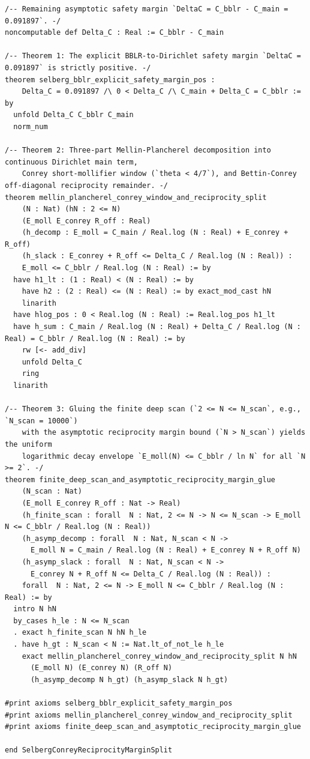 \documentclass[11pt,a4paper]{article}
\begin{document}
\begin{lstlisting}[language=Lean4]
/-- Remaining asymptotic safety margin `DeltaC = C_bblr - C_main = 0.091897`. -/
noncomputable def Delta_C : Real := C_bblr - C_main

/-- Theorem 1: The explicit BBLR-to-Dirichlet safety margin `DeltaC = 0.091897` is strictly positive. -/
theorem selberg_bblr_explicit_safety_margin_pos :
    Delta_C = 0.091897 /\ 0 < Delta_C /\ C_main + Delta_C = C_bblr := by
  unfold Delta_C C_bblr C_main
  norm_num

/-- Theorem 2: Three-part Mellin-Plancherel decomposition into continuous Dirichlet main term,
    Conrey short-mollifier window (`theta < 4/7`), and Bettin-Conrey off-diagonal reciprocity remainder. -/
theorem mellin_plancherel_conrey_window_and_reciprocity_split
    (N : Nat) (hN : 2 <= N)
    (E_moll E_conrey R_off : Real)
    (h_decomp : E_moll = C_main / Real.log (N : Real) + E_conrey + R_off)
    (h_slack : E_conrey + R_off <= Delta_C / Real.log (N : Real)) :
    E_moll <= C_bblr / Real.log (N : Real) := by
  have h1_lt : (1 : Real) < (N : Real) := by
    have h2 : (2 : Real) <= (N : Real) := by exact_mod_cast hN
    linarith
  have hlog_pos : 0 < Real.log (N : Real) := Real.log_pos h1_lt
  have h_sum : C_main / Real.log (N : Real) + Delta_C / Real.log (N : Real) = C_bblr / Real.log (N : Real) := by
    rw [<- add_div]
    unfold Delta_C
    ring
  linarith

/-- Theorem 3: Gluing the finite deep scan (`2 <= N <= N_scan`, e.g., `N_scan = 10000`)
    with the asymptotic reciprocity margin bound (`N > N_scan`) yields the uniform
    logarithmic decay envelope `E_moll(N) <= C_bblr / ln N` for all `N >= 2`. -/
theorem finite_deep_scan_and_asymptotic_reciprocity_margin_glue
    (N_scan : Nat)
    (E_moll E_conrey R_off : Nat -> Real)
    (h_finite_scan : forall  N : Nat, 2 <= N -> N <= N_scan -> E_moll N <= C_bblr / Real.log (N : Real))
    (h_asymp_decomp : forall  N : Nat, N_scan < N ->
      E_moll N = C_main / Real.log (N : Real) + E_conrey N + R_off N)
    (h_asymp_slack : forall  N : Nat, N_scan < N ->
      E_conrey N + R_off N <= Delta_C / Real.log (N : Real)) :
    forall  N : Nat, 2 <= N -> E_moll N <= C_bblr / Real.log (N : Real) := by
  intro N hN
  by_cases h_le : N <= N_scan
  . exact h_finite_scan N hN h_le
  . have h_gt : N_scan < N := Nat.lt_of_not_le h_le
    exact mellin_plancherel_conrey_window_and_reciprocity_split N hN
      (E_moll N) (E_conrey N) (R_off N)
      (h_asymp_decomp N h_gt) (h_asymp_slack N h_gt)

#print axioms selberg_bblr_explicit_safety_margin_pos
#print axioms mellin_plancherel_conrey_window_and_reciprocity_split
#print axioms finite_deep_scan_and_asymptotic_reciprocity_margin_glue

end SelbergConreyReciprocityMarginSplit

\end{lstlisting}
\end{document}
